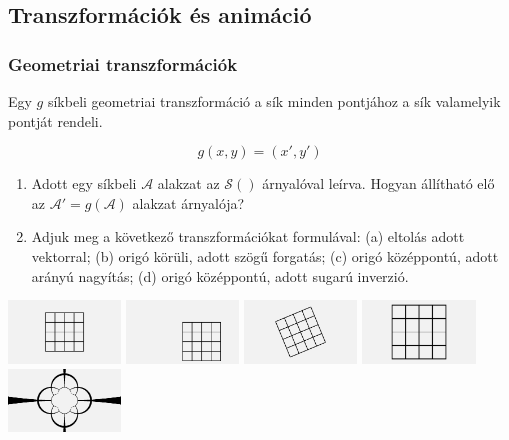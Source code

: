 \subsection{Transzformációk és animáció}

\subsubsection{Geometriai transzformációk}

Egy $g$ síkbeli geometriai transzformáció a sík minden pontjához a sík valamelyik pontját rendeli.

$$g(x, y) = (x', y')$$

\matfeladatok

\begin{enumerate}[resume]
  \item Adott egy síkbeli $\mathcal{A}$ alakzat az $\mathcal{S}()$ árnyalóval leírva. Hogyan állítható elő
  az $\mathcal{A}' = g(\mathcal{A})$ alakzat árnyalója?
  \item Adjuk meg a következő transzformációkat formulával:
  (a) eltolás adott vektorral;
  (b) origó körüli, adott szögű forgatás;
  (c) origó középpontú, adott arányú nagyítás;
  (d) origó középpontú, adott sugarú inverzió.
\end{enumerate}

\begin{center}
  \hfill
  \includegraphics[width=3cm]{images/f16_base.png}\hfill
  \includegraphics[width=3cm]{images/f16_a.png}\hfill
  \includegraphics[width=3cm]{images/f16_b.png}\hfill
  \includegraphics[width=3cm]{images/f16_c.png}\hfill
  \includegraphics[width=3cm]{images/f16_d.png}\hfill~
\end{center}

